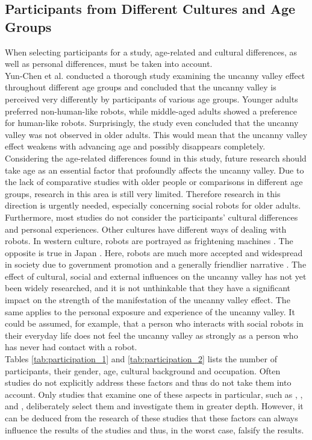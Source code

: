 \subsection{Participants from Different Cultures and Age Groups}
When selecting participants for a study, age-related and cultural differences, as well as personal differences, must be taken into account.\\
Yun-Chen et al. \cite{age_differences} conducted a thorough study examining the uncanny valley effect throughout different age groups and concluded that the uncanny valley is perceived very differently by participants of various age groups. Younger adults
preferred non-human-like robots, while middle-aged adults showed a preference for human-like robots. Surprisingly, the study even concluded that the uncanny valley was not observed in older adults. This would mean that the uncanny valley effect weakens with advancing age and possibly disappears completely. Considering the age-related differences found in this study, future research should take age as an essential factor that profoundly affects the uncanny valley. Due to the lack of comparative studies with older people or comparisons in different age groups, research in this area is still very limited. Therefore research in this direction is urgently needed, especially concerning social robots for older adults.\\
Furthermore, most studies do not consider the participants' cultural differences and personal experiences. Other cultures have different ways of dealing with robots. In western culture, robots are portrayed as frightening machines \cite{japan_robot_friendly}. The opposite is true in Japan \cite{japan_robot_friendly}. Here, robots are much more accepted and widespread in society due to government promotion and a generally friendlier narrative \cite{japan_robot_friendly}. The effect of cultural, social and external influences on the uncanny valley has not yet been widely researched, and it is not unthinkable that they have a significant impact on the strength of the manifestation of the uncanny valley effect. The same applies to the personal exposure and experience of the uncanny valley. It could be assumed, for example, that a person who interacts with social robots in their everyday life does not feel the uncanny valley as strongly as a person who has never had contact with a robot.\\
Tables \ref{tab:participation_1} and \ref{tab:participation_2} lists the number of participants, their gender, age, cultural background and occupation. Often studies do not explicitly address these factors and thus do not take them into account. Only studies that examine one of these aspects in particular, such as \cite{childrens_responding}, \cite{uncanny_infants}, \cite{uncanny_infant_discrimination} and \linebreak \cite{age_differences}, deliberately select them and investigate them in greater depth. However, it can be deduced from the research of these studies that these factors can always influence the results of the studies and thus, in the worst case, falsify the results. 
